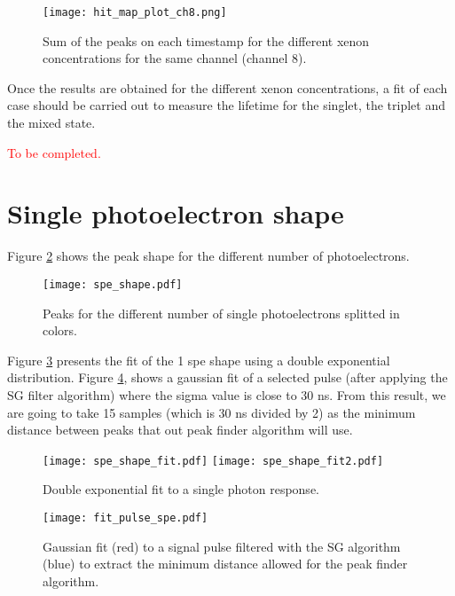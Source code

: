 \documentclass[11pt,a4paper,english,oneside, pdf]{article}
\begin{document}
	\begin{figure}[!h]
	\begin{center}
		\texttt{[image: hit\_map\_plot\_ch8.png]}
		\caption{Sum of the peaks on each timestamp for the different xenon concentrations for the same channel (channel 8).}
		\label{fig:hit_map_plot_ch8}
	\end{center}
	\end{figure}
	
	
	Once the results are obtained for the different xenon concentrations, a fit of each case should be carried out to measure the lifetime for the singlet, the triplet and the mixed state. 

	\textcolor{red}{To be completed.}
	
	
	
	
	\clearpage
	
	\section{Single photoelectron shape}
	
	Figure \ref{fig:spe_shape} shows the peak shape for the different number of photoelectrons.
	
	\begin{figure}[!h]
		\begin{center}
			\texttt{[image: spe\_shape.pdf]}
			\caption{Peaks for the different number of single photoelectrons splitted in colors.}
			\label{fig:spe_shape}
		\end{center}
	\end{figure}
	
	Figure \ref{fig:spe_shape_fit} presents the fit of the 1 spe shape using a double exponential distribution. Figure \ref{fig:fit_pulse_spe}, shows a gaussian fit of a selected pulse (after applying the SG filter algorithm) where the sigma value is close to 30 ns. From this result, we are going to take 15 samples (which is 30 ns divided by 2) as the minimum distance between peaks that out peak finder algorithm will use.
	
	\begin{figure}[!h]
		\centering
		\texttt{[image: spe\_shape\_fit.pdf]}
		\texttt{[image: spe\_shape\_fit2.pdf]}
		\caption{Double exponential fit to a single photon response.}
		\label{fig:spe_shape_fit}
	\end{figure}
	
	\begin{figure}[!h]
		\begin{center}
			\texttt{[image: fit\_pulse\_spe.pdf]}
			\caption{Gaussian fit (red) to a signal pulse filtered with the SG algorithm (blue) to extract the minimum distance allowed for the peak finder algorithm.}
			\label{fig:fit_pulse_spe}
		\end{center}
	\end{figure}
	
\end{document}
